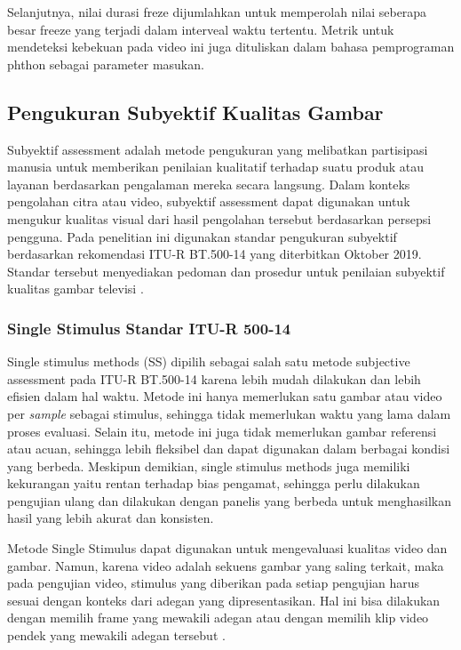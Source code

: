 Selanjutnya, nilai durasi freze dijumlahkan untuk memperolah nilai seberapa besar freeze yang terjadi dalam interveal waktu tertentu. Metrik untuk mendeteksi kebekuan pada video ini juga dituliskan dalam bahasa pemprograman phthon sebagai parameter masukan.

\subsection{Pengukuran Subyektif Kualitas Gambar}
\hspace{1,2cm}
Subyektif assessment adalah metode pengukuran yang melibatkan partisipasi manusia untuk memberikan penilaian kualitatif terhadap suatu produk atau layanan berdasarkan pengalaman mereka secara langsung. Dalam konteks pengolahan citra atau video, subyektif assessment dapat digunakan untuk mengukur kualitas visual dari hasil pengolahan tersebut berdasarkan persepsi pengguna. Pada penelitian ini digunakan standar pengukuran subyektif berdasarkan rekomendasi ITU-R BT.500-14 yang diterbitkan Oktober 2019. Standar tersebut menyediakan pedoman dan prosedur untuk penilaian subyektif kualitas gambar televisi \citep{IRB2019}. 

\subsubsection{Single Stimulus Standar ITU-R 500-14}
\hspace{1,2cm}
Single stimulus methods (SS) dipilih sebagai salah satu metode subjective assessment pada ITU-R BT.500-14 karena lebih mudah dilakukan dan lebih efisien dalam hal waktu. Metode ini hanya memerlukan satu gambar  atau video per \textit{sample} sebagai stimulus, sehingga tidak memerlukan waktu yang lama dalam proses evaluasi. Selain itu, metode ini juga tidak memerlukan gambar referensi atau acuan, sehingga lebih fleksibel dan dapat digunakan dalam berbagai kondisi yang berbeda. Meskipun demikian, single stimulus methods juga memiliki kekurangan yaitu rentan terhadap bias pengamat, sehingga perlu dilakukan pengujian ulang dan dilakukan dengan panelis yang berbeda untuk menghasilkan hasil yang lebih akurat dan konsisten.

Metode Single Stimulus dapat digunakan untuk mengevaluasi kualitas video dan gambar. Namun, karena video adalah sekuens gambar yang saling terkait, maka pada pengujian video, stimulus yang diberikan pada setiap pengujian harus sesuai dengan konteks dari adegan yang dipresentasikan. Hal ini bisa dilakukan dengan memilih frame yang mewakili adegan atau dengan memilih klip video pendek yang mewakili adegan tersebut \citep{Seshadrinathan_2010}.

